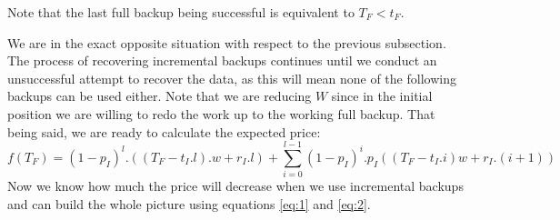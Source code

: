 \documentclass[11pt, a4paper]{article}
\theoremstyle{definition}
\begin{document}
		Note that the last full backup being successful is equivalent to $T_F<t_F$.\par
		We are in the exact opposite situation with respect to the previous subsection. The process of recovering incremental backups continues until we conduct an unsuccessful attempt to recover the data, as this will mean none of the following backups can be used either. Note that we are reducing $W$ since in the initial position we are willing to redo the work up to the working full backup. That being said, we are ready to calculate the expected price:
		\begin{equation}
		\label{eq:2}
			f(T_F) = (1-p_I)^l.((T_F-t_I.l).w + r_I.l) + \displaystyle \sum_{i=0}^{l-1} (1-p_I)^{i}.p_I((T_F-t_I.i)w + r_I.(i+1))
		\end{equation}
		Now we know how much the price will decrease when we use incremental backups and can build the whole picture using equations \ref{eq:1} and \ref{eq:2}.
\end{document}
